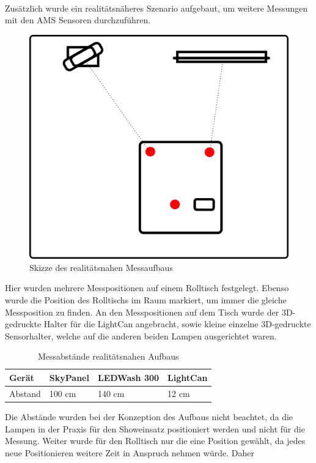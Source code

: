 \documentclass[11pt]{scrartcl}
\begin{document}
\\
Zusätzlich wurde ein realitätsnäheres Szenario aufgebaut, um weitere Messungen mit den AMS Sensoren durchzuführen.
\begin{figure}[H]
    \begin{center}
        \includegraphics[width=.8\textwidth]{images/meassureScenarioRealistic.png} %
    \end{center}
    \caption{Skizze des realitätsnahen Messaufbaus} \label{fig:measureScribbleReal}
\end{figure}
\noindent
Hier wurden mehrere Messpositionen auf einem Rolltisch festgelegt. Ebenso wurde die Position des Rolltischs im Raum markiert, um immer die
gleiche Messposition zu finden. An den Messpositionen auf dem Tisch wurde der 3D-gedruckte Halter für die LightCan angebracht, sowie kleine
einzelne 3D-gedruckte Sensorhalter, welche auf die anderen beiden Lampen ausgerichtet waren.
\begin{table}[H]
    \begin{tabularx}{\textwidth}{|l|X|X|X|}
        \hline Gerät  & SkyPanel & LEDWash 300 & LightCan\\\hline
        Abstand       & 100 cm   & 140 cm      & 12 cm   \\\hline
    \end{tabularx}
    \caption{Messabstände realitätsnahen Aufbaus}
\end{table}
\noindent
Die Abstände wurden bei der Konzeption des Aufbaus nicht beachtet, da die Lampen in der Praxis für den Showeinsatz positioniert werden und nicht
für die Messung. Weiter wurde für den Rolltisch nur die eine Position gewählt, da jedes neue Positionieren weitere Zeit in Anspruch nehmen würde. Daher
\end{document}
